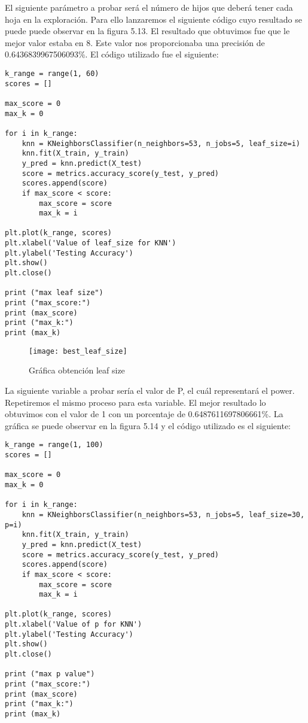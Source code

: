 El siguiente parámetro a probar será el número de hijos que deberá tener
cada hoja en la exploración. Para ello lanzaremos el siguiente código cuyo
resultado se puede puede observar en la figura 5.13. El resultado que obtuvimos
fue que le mejor valor estaba en 8. Este valor nos proporcionaba una precisión
de 0.6436839967506093\%. El código utilizado fue el siguiente:


\begin{lstlisting}
k_range = range(1, 60)
scores = []

max_score = 0
max_k = 0

for i in k_range:
    knn = KNeighborsClassifier(n_neighbors=53, n_jobs=5, leaf_size=i)
    knn.fit(X_train, y_train)
    y_pred = knn.predict(X_test)
    score = metrics.accuracy_score(y_test, y_pred)
    scores.append(score)
    if max_score < score:
        max_score = score
        max_k = i

plt.plot(k_range, scores)
plt.xlabel('Value of leaf_size for KNN')
plt.ylabel('Testing Accuracy')
plt.show()
plt.close()

print ("max leaf size")
print ("max_score:")
print (max_score)
print ("max_k:")
print (max_k)
\end{lstlisting}

\begin{figure}[htb]
  \centering
    \texttt{[image: best\_leaf\_size]}
  \caption[Gráfica obtención leaf size]{Gráfica obtención leaf size}
  \label{fig:Gráfica obtención leaf size}
\end{figure}

La siguiente variable a probar sería el valor de P, el cuál representará el power.
Repetiremos el mismo proceso para esta variable. El mejor resultado lo obtuvimos con
el valor de 1 con un porcentaje de 0.6487611697806661\%. La gráfica se puede observar
en la figura 5.14 y el código utilizado es el siguiente:


\begin{lstlisting}
k_range = range(1, 100)
scores = []

max_score = 0
max_k = 0

for i in k_range:
    knn = KNeighborsClassifier(n_neighbors=53, n_jobs=5, leaf_size=30, p=i)
    knn.fit(X_train, y_train)
    y_pred = knn.predict(X_test)
    score = metrics.accuracy_score(y_test, y_pred)
    scores.append(score)
    if max_score < score:
        max_score = score
        max_k = i

plt.plot(k_range, scores)
plt.xlabel('Value of p for KNN')
plt.ylabel('Testing Accuracy')
plt.show()
plt.close()

print ("max p value")
print ("max_score:")
print (max_score)
print ("max_k:")
print (max_k)
\end{lstlisting}

